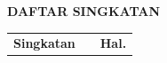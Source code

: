 \cleardoublepage
\vspace{2cm}
\begin{center}
{\fontsize{14}{16.8}\selectfont\textbf{DAFTAR SINGKATAN}}\\[1em]
\end{center}
\label{chap:singkatan}
\setcounter{chapter}{0}
\setcounter{section}{0}
\vspace{2em}

\begin{longtable}{@{} l >{\raggedright\arraybackslash}p{9cm} l @{}}
\multicolumn{1}{l}{\textbf{Singkatan}} &
\multicolumn{1}{l}{\textbf{Deskripsi}} &
\multicolumn{1}{l}{\textbf{Hal.}} \\



\end{longtable}
